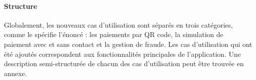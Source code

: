\paragraph{Structure} Globalement, les nouveaux cas d'utilisation sont séparés en trois catégories, comme le spécifie l'énoncé : les paiements par QR code, la simulation de paiement avec et sans contact et la gestion de fraude. Les cas d'utilisation qui ont été ajoutés correspondent aux fonctionnalités principales de l'application. Une description semi-structurée de chacun des cas d'utilisation peut être trouvée en annexe.